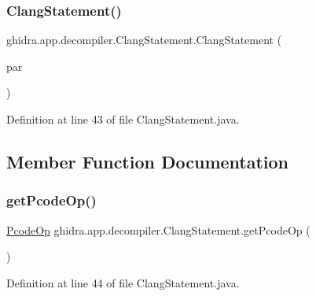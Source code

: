 \subsubsection{\texorpdfstring{ClangStatement()}{ClangStatement()}}
{\footnotesize\ttfamily ghidra.\+app.\+decompiler.\+Clang\+Statement.\+Clang\+Statement (\begin{DoxyParamCaption}\item[{\mbox{\hyperlink{interfaceghidra_1_1app_1_1decompiler_1_1_clang_node}{Clang\+Node}}}]{par }\end{DoxyParamCaption})\hspace{0.3cm}{\ttfamily [inline]}}



Definition at line 43 of file Clang\+Statement.\+java.



\subsection{Member Function Documentation}
\mbox{\label{classghidra_1_1app_1_1decompiler_1_1_clang_statement_a2b7c3031338fa026930e7211623deb5e}} 
\subsubsection{\texorpdfstring{getPcodeOp()}{getPcodeOp()}}
{\footnotesize\ttfamily \mbox{\hyperlink{class_pcode_op}{Pcode\+Op}} ghidra.\+app.\+decompiler.\+Clang\+Statement.\+get\+Pcode\+Op (\begin{DoxyParamCaption}{ }\end{DoxyParamCaption})\hspace{0.3cm}{\ttfamily [inline]}}



Definition at line 44 of file Clang\+Statement.\+java.

\mbox{\label{classghidra_1_1app_1_1decompiler_1_1_clang_statement_ad042eadde979f215fd60a9e3aae17cc3}} 
